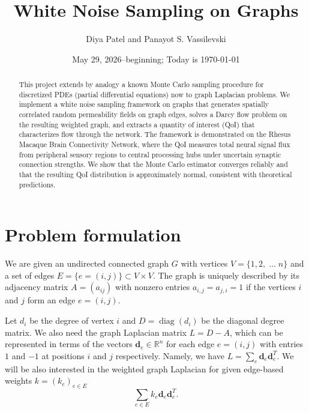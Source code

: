 \documentclass[a4paper,12pt]{amsart}
\title[White Noise Sampling on Graphs]{White Noise Sampling on Graphs}
\author{Diya Patel and Panayot S. Vassilevski}
\date{May 29, 2026--beginning; Today is \today}
\numberwithin{equation}{section}
\newcommand{\diag}{\operatorname{diag}}
\def\bd{{\mathbf d}}
\begin{document}
\begin{abstract}
This project extends by analogy a known Monte Carlo sampling procedure for 
discretized PDEs (partial differential equations) now to graph Laplacian 
problems. We implement a white noise sampling framework on graphs that 
generates spatially correlated random permeability fields on graph edges, 
solves a Darcy flow problem on the resulting weighted graph, and extracts a 
quantity of interest (QoI) that characterizes flow through the network. The 
framework is demonstrated on the Rhesus Macaque Brain Connectivity Network, 
where the QoI measures total neural signal flux from peripheral sensory 
regions to central processing hubs under uncertain synaptic connection 
strengths. We show that the Monte Carlo estimator converges reliably and 
that the resulting QoI distribution is approximately normal, consistent with 
theoretical predictions.
\end{abstract}

\maketitle

\section{Problem formulation}

We are given an undirected connected graph $G$ with vertices
$V=\{1,2,\;\dots\;n\}$ and a set of edges $E = \{e = (i,j) \} \subset V \times V$. 
The graph is uniquely described by its adjacency matrix $A = (a_{ij})$ with 
nonzero entries $a_{i,j}= a_{j,i} = 1$ if the vertices $i$ and $j$ form an 
edge $e = (i,j)$.

Let $d_i$ be the degree of vertex $i$ and $D = \diag(d_i)$ be the diagonal 
degree matrix. We also need the graph Laplacian matrix $L = D -A$, which can 
be represented in terms of the vectors $\bd_e \in {\mathbb R}^n$ for each 
edge $e=(i,j)$ with entries $1$ and $-1$ at positions $i$ and $j$ 
respectively. Namely, we have $L = \sum\limits_e \bd_e\bd^T_e$. We will be 
also interested in the weighted graph Laplacian for given edge-based 
weights $k =(k_e)_{e \in E}$
\begin{equation}\label{weighted graph Laplacian}
\sum\limits_{e \in E} k_e \bd_e \bd^T_e.
\end{equation}
\end{document}
